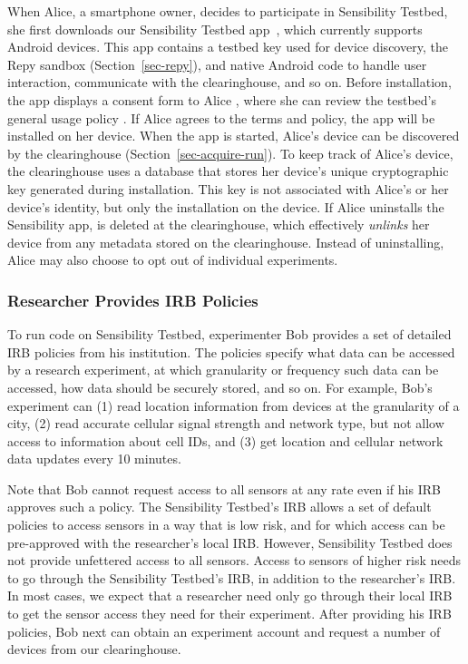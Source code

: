When Alice, a smartphone owner, decides to participate in
Sensibility Testbed, she first downloads our Sensibility Testbed
app~\cite{sensibility-app}, which currently supports Android devices.
This app contains a testbed key  used for 
device discovery, the Repy sandbox (Section~\ref{sec-repy}), 
and native Android code to handle user interaction, communicate 
with the clearinghouse, and so on. Before installation, the app displays a
consent form to Alice , where she can review
the testbed's general usage policy . If Alice
agrees to the terms and policy, the app will be installed on her
device. When the app is started, Alice's device can be
discovered by the clearinghouse (Section~\ref{sec-acquire-run}). 
To keep track of Alice's device, the
clearinghouse uses a database that stores her device's unique
cryptographic key  generated during
installation. This key is not associated with Alice's or her
device's identity, but only the installation on the device. If
Alice uninstalls the Sensibility app,  is
deleted at the clearinghouse, which effectively \textit{unlinks}
her device from any metadata stored on the clearinghouse.
Instead of uninstalling, Alice may also choose to opt out of
individual experiments.

\subsubsection{Researcher Provides IRB
Policies}\label{sec-irb-policy}

To run code on Sensibility Testbed, experimenter Bob provides a
set of detailed IRB policies from his institution. The policies specify 
what data can be accessed by a research experiment, at which 
granularity or frequency such data can be accessed, how data 
should be securely stored, and so on.
For example, Bob's experiment can (1) read location information
from devices at the granularity of a city, (2) read accurate
cellular signal strength and network type, but not allow access to 
information about cell IDs, and (3) get location and
cellular network data updates every 10 minutes. 

Note that Bob cannot request access to all sensors at any rate
even if his IRB approves such a policy. The Sensibility Testbed's
IRB allows a set of default policies to access sensors in a
way that is low risk, and for which access can be pre-approved with the
researcher's local IRB. However, Sensibility Testbed does not
provide unfettered access to all sensors. Access to sensors of
higher risk needs to go through the Sensibility Testbed's IRB,
in addition to the researcher's IRB. In most cases, we expect
that a researcher need only go through their local IRB to get
the sensor access they need for their experiment. After
providing his IRB policies, Bob next can obtain an experiment
account and request a number of devices from our clearinghouse.


